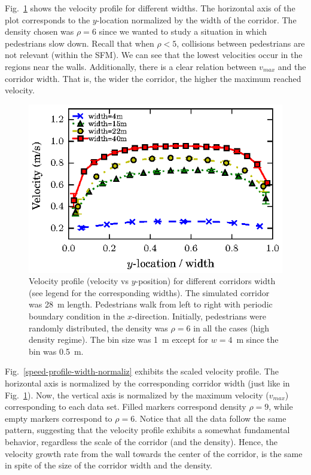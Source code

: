 Fig.~\ref{speed-profile-multi_width} shows the velocity profile for different widths. The horizontal axis of the plot corresponds to the $y$-location normalized by the width of the corridor. {\color{red} The density chosen was $\rho = 6$ since we wanted to study a situation in which pedestrians slow down.} Recall that when $\rho<5$, collisions between pedestrians are not relevant (within the SFM). We can see that the lowest velocities occur in the regions near the walls. Additionally, there is a clear relation between $v_{max}$ and the corridor width. That is, the wider the corridor, the higher the maximum reached velocity.\\


\begin{figure}[htbp!]
\includegraphics[width=\columnwidth]
{plots/v(y)_multi_width.eps}
\caption{\label{speed-profile-multi_width} Velocity profile (velocity vs $y$-position) for different corridors width (see legend for the corresponding widths). The simulated corridor was 28~m length. Pedestrians walk from left to right with periodic boundary condition in the $x$-direction. Initially, pedestrians were randomly distributed, the density was $\rho = 6$ in all the cases (high density regime). The bin size was 1~m except for $w=4$~m since the bin was 0.5~m.}
\end{figure}


Fig.~\ref{speed-profile-width-normaliz} exhibits the scaled velocity profile. The horizontal axis is normalized by the corresponding corridor width (just like in Fig.~\ref{speed-profile-multi_width}). Now, the vertical axis is normalized by the maximum velocity ($v_{max}$) corresponding to each data set. Filled markers correspond density $\rho=9$, while empty markers correspond to $\rho=6$. Notice that all the data follow the same  pattern, suggesting that the velocity profile exhibits a somewhat fundamental behavior, regardless the scale of the corridor (and the density). Hence, the velocity growth rate from the wall towards the center of the corridor, is the same in spite of the size of the corridor width and the density. \\

